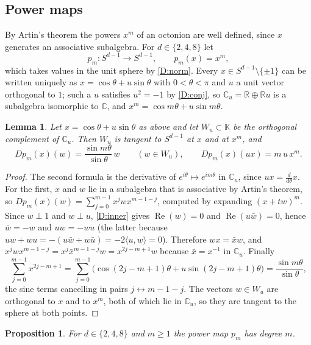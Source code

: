 \documentclass[11pt]{amsart}
\numberwithin{equation}{section}
\theoremstyle{plain}
\newtheorem{proposition}[theorem]{Proposition}
\newtheorem{lemma}[theorem]{Lemma}
\theoremstyle{definition}
\theoremstyle{remark}
\newcommand{\R}{\mathbb{R}}
\newcommand{\C}{\mathbb{C}}
\newcommand{\K}{\mathbb{K}}
\renewcommand{\Re}{\operatorname{Re}}
\begin{document}
\subsection{Power maps}\label{sec:powers}

By Artin's theorem the powers $x^m$ of an octonion are well defined, since $x$ generates an associative subalgebra. For $d\in\{2,4,8\}$ let
\[
p_m\colon S^{d-1}\to S^{d-1},\qquad p_m(x)=x^m ,
\]
which takes values in the unit sphere by \ref{D:norm}. Every $x\in S^{d-1}\setminus\{\pm1\}$ can be written uniquely as $x=\cos\theta+u\sin\theta$ with $0<\theta<\pi$ and $u$ a unit vector orthogonal to $1$; such a $u$ satisfies $u^2=-1$ by \ref{D:conj}, so $\C_u=\R\oplus\R u$ is a subalgebra isomorphic to $\C$, and $x^m=\cos m\theta+u\sin m\theta$.

\begin{lemma}\label{lem:powerderiv}
Let $x=\cos\theta+u\sin\theta$ as above and let $W_u\subset\K$ be the orthogonal complement of $\C_u$. Then $W_u$ is tangent to $S^{d-1}$ at $x$ and at $x^m$, and
\[
Dp_m(x)(w)=\frac{\sin m\theta}{\sin\theta}\,w\qquad(w\in W_u),\qquad Dp_m(x)(ux)=m\,u\,x^m .
\]
\end{lemma}

\begin{proof}
The second formula is the derivative of $e^{i\theta}\mapsto e^{im\theta}$ in $\C_u$, since $ux=\frac{d}{d\theta}x$. For the first, $x$ and $w$ lie in a subalgebra that is associative by Artin's theorem, so $Dp_m(x)(w)=\sum_{j=0}^{m-1}x^jwx^{m-1-j}$, computed by expanding $(x+tw)^m$. Since $w\perp1$ and $w\perp u$, \ref{D:inner} gives $\Re(w)=0$ and $\Re(u\bar w)=0$, hence $\bar w=-w$ and $uw=-wu$ (the latter because $uw+wu=-(u\bar w+w\bar u)=-2\langle u,w\rangle=0$). Therefore $wx=\bar xw$, and $x^jwx^{m-1-j}=x^j\bar x^{m-1-j}w=x^{2j-m+1}w$ because $\bar x=x^{-1}$ in $\C_u$. Finally
\[
\sum_{j=0}^{m-1}x^{2j-m+1}=\sum_{j=0}^{m-1}\bigl(\cos(2j-m+1)\theta+u\sin(2j-m+1)\theta\bigr)=\frac{\sin m\theta}{\sin\theta},
\]
the sine terms cancelling in pairs $j\leftrightarrow m-1-j$. The vectors $w\in W_u$ are orthogonal to $x$ and to $x^m$, both of which lie in $\C_u$, so they are tangent to the sphere at both points.
\end{proof}

\begin{proposition}\label{prop:powerdegree}
For $d\in\{2,4,8\}$ and $m\ge1$ the power map $p_m$ has degree $m$.
\end{proposition}
\end{document}
